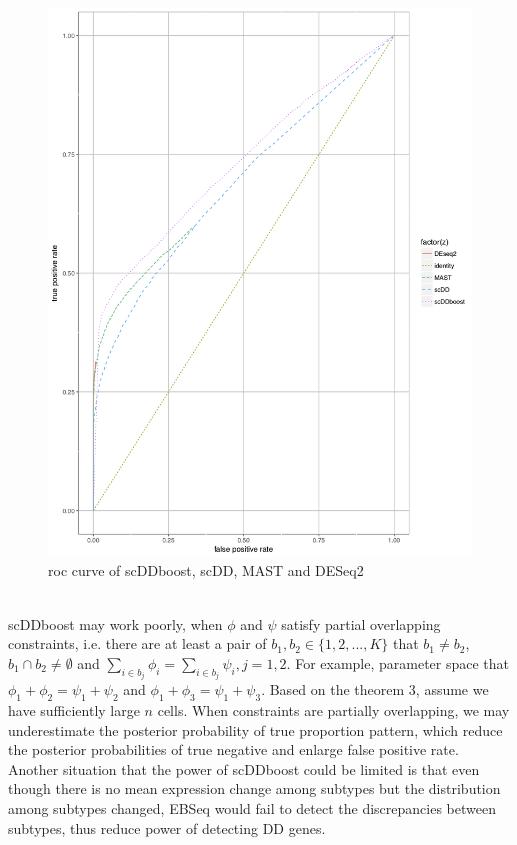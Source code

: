 \documentclass[11pt]{amsart}
\begin{document}
\begin{figure}[h]
  \includegraphics[scale = 0.3]{Splatter_roc.png}
  \caption{roc curve of scDDboost, scDD, MAST and DESeq2}
  \label{fig:3}
\end{figure}\\
scDDboost may work poorly, when $\phi$ and $\psi$ satisfy partial overlapping constraints, i.e. there are at least a pair of  $b_1, b_2 \in \{1, 2, ..., K \}$ that $b_1 \neq b_2$, $b_1 \cap b_2 \neq \emptyset$ and $\sum_{i\in b_j} \phi_i = \sum_{i\in b_j} \psi_i, j = 1, 2$. For example, parameter space that$\phi_1 + \phi_2 = \psi_1 + \psi_2$ and $\phi_1 + \phi_3 = \psi_1 + \psi_3$.  Based on the theorem 3, assume we have sufficiently large $n$ cells. When constraints are partially overlapping, we may underestimate the posterior probability of true proportion pattern, which reduce the posterior probabilities of true negative and enlarge false positive rate.\\
Another situation that the power of scDDboost could be limited is that even though there is no mean expression change among subtypes but the distribution among subtypes changed, EBSeq would fail to detect the discrepancies between subtypes, thus reduce power of detecting DD genes.\\
\end{document}
